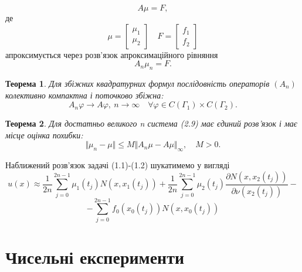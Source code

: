 \documentclass[a4 paper,12pt,ukrainian]{report}
\newtheorem{theorem}{\textbf{Теорема}}[chapter]
\begin{document}
\begin{equation*}
A\mu=F,
\end{equation*}
де 
\begin{equation*}
\mu=\left[
\begin{array}{c}
\mu_{1}\\
\mu_{2}
\end{array}
\right]\quad
F=\left[
\begin{array}{c}
f_{1}\\
f_{2}
\end{array}
\right]
\end{equation*}
апроксимується через розв'язок апроксимаційного рівняння
\begin{equation*}
A_{n}\mu_{n}=F.
\end{equation*}
\begin{theorem}
Для збіжних квадратурних формул послідовність операторів $(A_{n})$ колективно компактна і поточково збіжна:
\begin{equation*}
A_{n}\varphi\rightarrow A\varphi, \ n\to\infty \quad \forall\varphi\in C(\Gamma_{1})\times C(\Gamma_{2}).
\end{equation*}
\end{theorem}
\begin{theorem}
Для достатньо великого n система (2.9) має єдиний розв'язок і має місце оцінка похибки:
\begin{equation*}
\Vert\mu_{n}-\mu\Vert\le M\Vert A_{n}\mu-A\mu\Vert_{\infty}, \quad M>0.
\end{equation*}
\end{theorem}
\hspace*{\parindent}Наближений розв'язок задачі (1.1)-(1.2) шукатимемо у вигляді
\begin{equation*}
u(x)\approx\frac{1}{2n}\sum\limits_{j=0}^{2n-1}{\mu_1(t_j)N(x,x_1(t_j))}+\frac{1}{2n}\sum\limits_{j=0}^{2n-1}{\mu_2(t_j)\frac{\partial N(x,x_2(t_j))}{\partial\nu(x_2(t_j))}}-
\end{equation*}
\begin{equation*}
-\sum\limits_{j=0}^{2n-1}{f_0(x_0(t_j))N(x,x_0(t_j))}
\end{equation*}
\chapter{Чисельні експерименти}
\end{document}
